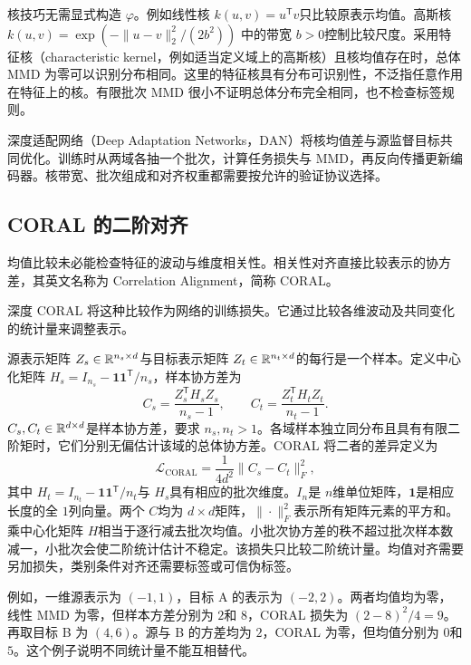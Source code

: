 核技巧无需显式构造 $\varphi$。例如线性核 $k(u,v)=u^{\mathsf T}v$只比较原表示均值。高斯核 $k(u,v)=\exp(-\|u-v\|_2^2/(2b^2))$ 中的带宽 $b>0$控制比较尺度。采用特征核（characteristic kernel，例如适当定义域上的高斯核）且核均值存在时，总体 MMD 为零可以识别分布相同。这里的特征核具有分布可识别性，不泛指任意作用在特征上的核。有限批次 MMD 很小不证明总体分布完全相同，也不检查标签规则。

深度适配网络（Deep Adaptation Networks，DAN）将核均值差与源监督目标共同优化\cite{long2015dan}。训练时从两域各抽一个批次，计算任务损失与 MMD，再反向传播更新编码器。核带宽、批次组成和对齐权重都需要按允许的验证协议选择。

\subsection{CORAL 的二阶对齐}
均值比较未必能检查特征的波动与维度相关性。相关性对齐直接比较表示的协方差，其英文名称为 Correlation Alignment，简称 CORAL。

深度 CORAL 将这种比较作为网络的训练损失\cite{sun2016coral}。它通过比较各维波动及共同变化的统计量来调整表示。

源表示矩阵 $Z_s\in\mathbb{R}^{n_s\times d}$与目标表示矩阵 $Z_t\in\mathbb{R}^{n_t\times d}$的每行是一个样本。定义中心化矩阵 $H_s=I_{n_s}-\mathbf1\mathbf1^{\mathsf T}/n_s$，样本协方差为
\begin{equation}
 C_s=\frac{Z_s^{\mathsf T}H_sZ_s}{n_s-1},\qquad
 C_t=\frac{Z_t^{\mathsf T}H_tZ_t}{n_t-1}.
\end{equation}
$C_s,C_t\in\mathbb{R}^{d\times d}$是样本协方差，要求 $n_s,n_t>1$。各域样本独立同分布且具有有限二阶矩时，它们分别无偏估计该域的总体协方差。CORAL 将二者的差异定义为
\begin{equation}
 \mathcal L_{\mathrm{CORAL}}=\frac1{4d^2}\|C_s-C_t\|_F^2,
\label{eq:transfer-coral}
\end{equation}
其中 $H_t=I_{n_t}-\mathbf1\mathbf1^{\mathsf T}/n_t$与 $H_s$具有相应的批次维度。$I_n$是 $n$维单位矩阵，$\mathbf1$是相应长度的全 $1$列向量。两个 $C$均为 $d\times d$矩阵，$\|\cdot\|_F^2$表示所有矩阵元素的平方和。乘中心化矩阵 $H$相当于逐行减去批次均值。小批次协方差的秩不超过批次样本数减一，小批次会使二阶统计估计不稳定。该损失只比较二阶统计量。均值对齐需要另加损失，类别条件对齐还需要标签或可信伪标签。

例如，一维源表示为 $(-1,1)$，目标 A 的表示为 $(-2,2)$。两者均值均为零，线性 MMD 为零，但样本方差分别为 $2$和 $8$，CORAL 损失为 $(2-8)^2/4=9$。再取目标 B 为 $(4,6)$。源与 B 的方差均为 $2$，CORAL 为零，但均值分别为 $0$和 $5$。这个例子说明不同统计量不能互相替代。

